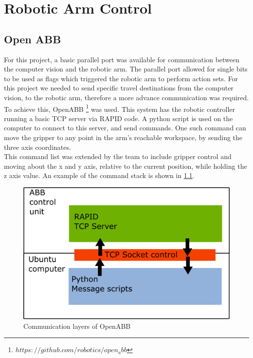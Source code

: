 \documentclass[11pt,a4paper]{report}
\begin{document}
\chapter{Robotic Arm Control}

\section{Open ABB}
For this project, a basic parallel port was available for communication between the computer vision and the robotic arm. The parallel port allowed for single bits to be used as flags which triggered the robotic arm to perform action sets. For this project we needed to send specific travel destinations from the computer vision, to the robotic arm, therefore a more advance communication was required. To achieve this, OpenABB \footnote{$https://github.com/robotics/open_abb$} was used. This system has the robotic controller running a basic TCP server via RAPID code. A python script is used on the computer to connect to this server, and send commands. One such command can move the gripper to any point in the arm's reachable workspace, by sending the three axis coordinates.\\
This command list was extended by the team to  include gripper control and moving about the x and y axis, relative to the current position, while holding the z axis value. 
An example of the command stack is shown in \cref{fig:commstack1}.
\begin{figure}[h]
\centering
\includegraphics[width=0.7\linewidth]{commstack1}
\caption{Communication layers of OpenABB}
\label{fig:commstack1}
\end{figure}
\end{document}
